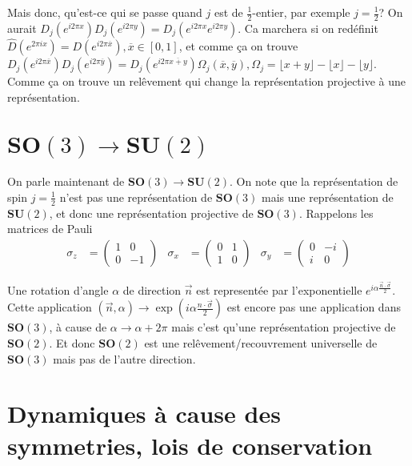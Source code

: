 \documentclass[10pt]{report}
\begin{document}
Mais donc, qu'est-ce qui se passe quand $j$ est de $\frac{1}{2}$-entier, par exemple $j = \frac{1}{2}$? On aurait $D_j(e^{i2\pi x})D_j(e^{i2\pi y}) = D_j\left( e^{i2\pi x}e^{i2\pi y} \right)$. Ca marchera si on red\'efinit $\hat{D}(e^{2\pi i x}) = D(e^{i2\pi \overline{x}}), \overline{x} \in \left[ 0,1 \right]$, et comme \c{c}a on trouve $D_j(e^{i2\pi \overline{x}})D_j(e^{i2\pi \overline{y}}) = D_j(e^{i2\pi \overline{x + y}})\Omega_j(\overline{x}, \overline{y}), \Omega_j = \lfloor x + y\rfloor - \lfloor x \rfloor - \lfloor y\rfloor$. Comme \c{c}a on trouve un rel\^evement qui change la repr\'esentation projective \`a une repr\'esentation.

\section{$\mathbf{SO}(3) \to \mathbf{SU}(2)$}

On parle maintenant de $\mathbf{SO}(3) \to \mathbf{SU}(2)$. On note que la repr\'esentation de spin $j = \frac{1}{2}$ n'est pas une repr\'esentation de $\mathbf{SO}(3)$ mais une repr\'esentation de $\mathbf{SU}(2)$, et donc une repr\'esentation projective de $\mathbf{SO}(3)$. Rappelons les matrices de Pauli
\begin{align}
    \sigma_z &= \begin{pmatrix} 1 & 0 \\ 0 & -1 \end{pmatrix} & \sigma_x &= \begin{pmatrix} 0 & 1 \\ 1 & 0 \end{pmatrix}  & \sigma_y &= \begin{pmatrix} 0 & -i \\ i & 0 \end{pmatrix} 
\end{align}

Une rotation d'angle $\alpha$ de direction $\vec{n}$ est represent\'ee par l'exponentielle $e^{i\alpha \frac{\vec{n} \cdot \vec{\sigma}}{2}}$. Cette application $(\vec{n}, \alpha) \to \exp\left( i\alpha\frac{n \cdot \vec{\sigma}}{2} \right)$ est encore pas une application dans $\mathbf{SO}(3)$, \`a cause de $\alpha \to \alpha + 2\pi$ mais c'est qu'une repr\'esentation projective de $\mathbf{SO}(2)$. Et donc $\mathbf{SO}(2)$ est une rel\^evement/recouvrement universelle de $\mathbf{SO}(3)$ mais pas de l'autre direction.

\section{Dynamiques \`a cause des symmetries, lois de conservation}
\end{document}
